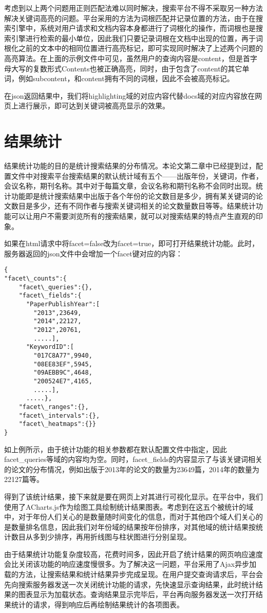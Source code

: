 考虑到以上两个问题用正则匹配法难以同时解决，搜索平台不得不采取另一种方法解决关键词高亮的问题。平台采用的方法为词根匹配并记录位置的方法，由于在搜索引擎中，系统对用户请求和文档内容本身都进行了词根化的操作，而词根也是搜索引擎进行检索的最小单位，因此我们只要记录词根在文档中出现的位置，再于词根化之前的文本中的相同位置进行高亮标记，即可实现同时解决了上述两个问题的高亮算法。在上面的示例文件中可见，虽然用户的查询内容是content，但是首字母大写的复数形式Contents也被正确高亮，同时，由于包含了content的其它单词，例如subcontent，和content拥有不同的词根，因此不会被高亮标记。

在json返回结果中，我们将highlighting域的对应内容代替docs域的对应内容放在网页上进行展示，即可达到关键词被高亮显示的效果。

\section{结果统计}
结果统计功能的目的是统计搜索结果的分布情况。本论文第二章中已经提到过，配置文件中对搜索平台搜索结果的默认统计域有五个——出版年份，关键词，作者，会议名称，期刊名称。其中对于每篇文章，会议名称和期刊名称不会同时出现。统计功能即是统计搜索结果中出版于各个年份的论文数目是多少，拥有某关键词的论文数目是多少，还有不同作者与搜索关键词相关的论文数量数目等等。结果统计功能可以让用户不需要浏览所有的搜索结果，就可以对搜索结果的特点产生直观的印象。

如果在html请求中将facet=false改为facet=true，即可打开结果统计功能。此时，服务器返回的json文件中会增加一个facet键对应的内容：

\begin{lstlisting}[caption={结果统计}, label=facet, escapeinside="", numbers=none]
{
"facet\_counts":{
    "facet\_queries":{},
    "facet\_fields":{
      "PaperPublishYear":[
        "2013",23649,
        "2014",22127,
        "2012",20761,
        .....],
      "KeywordID":[
        "017C8A77",9940,
        "08EE83EF",5945,
        "09AEBB9C",4648,
        "200524E7",4165,
        .....],
      .....},
    "facet\_ranges":{},
    "facet\_intervals":{},
    "facet\_heatmaps":{}}
}
\end{lstlisting}

如上例所示，由于统计功能的相关参数都在默认配置文件中指定，因此facet\_queries等域的内容均为空。同时，facet\_fields的内容显示了与该关键词相关的论文的分布情况，例如出版于2013年的论文的数量为23649篇，2014年的数量为22127篇等。

得到了该统计结果，接下来就是要在网页上对其进行可视化显示。在平台中，我们使用了ACharts.js作为绘图工具绘制统计结果图表。考虑到在这五个被统计的域中，对于年份人们关心的是数量随时间变化的信息，而对于其他四个域人们关心的是数量排名信息，因此我们对年份域的结果按年份排序，对其他域的统计结果按统计数目从多到少排序，再用折线图与柱状图进行分别呈现。

由于结果统计功能复杂度较高，花费时间多，因此开启了统计结果的网页响应速度会比关闭该功能的响应速度慢很多。为了解决这一问题，平台采用了Ajax异步加载的方法，让搜索结果和统计结果异步完成呈现。在用户提交查询请求后，平台会先向搜索服务器发送一次关闭统计功能的请求，先快速显示查询结果，此时统计结果的图表显示为加载状态。查询结果显示完毕后，平台再向服务器发送一次打开结果统计的请求，得到响应后再绘制结果统计的各项图表。